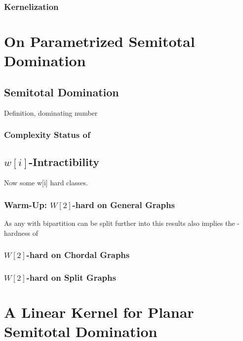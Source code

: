 \subsection{Kernelization}


\chapter{On Parametrized Semitotal Domination}
\section{Semitotal Domination}

\sdom

Definition, dominating number

\subsection*{Complexity Status of \sdom}

\section{\hmath $w[i]$-Intractibility}

Now some  w[i] hard classes. 

\subsection{Warm-Up: \hmath $W[2]$-hard on General Graphs}


As any \bg with bipartition can be split further into \rpg this results also implies the \wone-hardness of \rpg



\subsection{\hmath $W[2]$-hard on Chordal Graphs}

\subsection{\hmath $W[2]$-hard on Split Graphs}

\chapter{A Linear Kernel for Planar Semitotal Domination}

